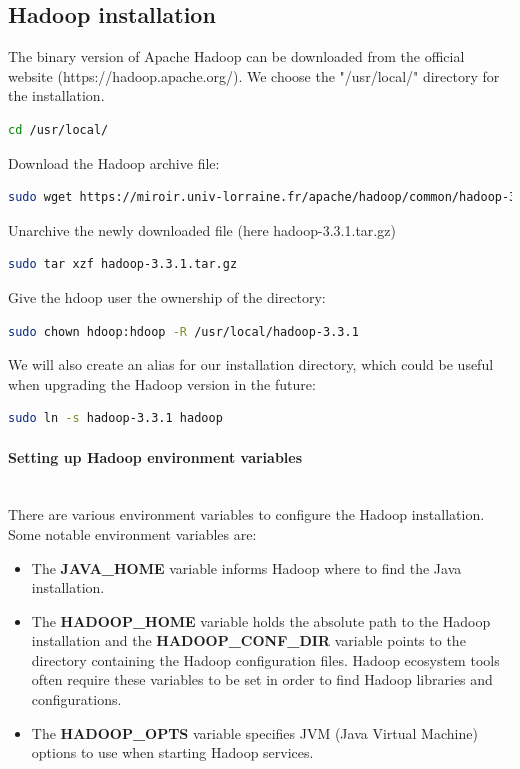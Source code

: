 \documentclass[12pt,english]{book}
\begin{document}
\subsection{Hadoop installation}


The binary version of Apache Hadoop can be downloaded from the official website (https://hadoop.apache.org/).
We choose the "/usr/local/" directory for the installation.
\begin{lstlisting}[language=bash, frame=single, basicstyle=\footnotesize]
cd /usr/local/
\end{lstlisting}
Download the Hadoop archive file:
\begin{lstlisting}[language=bash, frame=single, basicstyle=\footnotesize]
sudo wget https://miroir.univ-lorraine.fr/apache/hadoop/common/hadoop-3.3.1/hadoop-3.3.1.tar.gz
\end{lstlisting}
Unarchive the newly downloaded file (here hadoop-3.3.1.tar.gz)
\begin{lstlisting}[language=bash, frame=single, basicstyle=\footnotesize]
sudo tar xzf hadoop-3.3.1.tar.gz
\end{lstlisting}
Give the hdoop user the ownership of the directory:
\begin{lstlisting}[language=bash, frame=single, basicstyle=\footnotesize]
sudo chown hdoop:hdoop -R /usr/local/hadoop-3.3.1
\end{lstlisting}
We will also create an alias for our installation directory, which could be useful when upgrading the Hadoop version in the future:
\begin{lstlisting}[language=bash, frame=single, basicstyle=\footnotesize]
sudo ln -s hadoop-3.3.1 hadoop
\end{lstlisting}


\paragraph{Setting up Hadoop environment variables}\mbox{}\\


There are various environment variables to configure the Hadoop installation.
Some notable environment variables are:
\begin{itemize}
\item
The \textbf{JAVA\_HOME} variable informs Hadoop where to find the Java installation.

\item
The \textbf{HADOOP\_HOME} variable holds the absolute path to the Hadoop installation and the \textbf{HADOOP\_CONF\_DIR} variable points to the directory containing the Hadoop configuration files.
Hadoop ecosystem tools often require these variables to be set in order to find Hadoop libraries and configurations.

\item
The \textbf{HADOOP\_OPTS}  variable specifies JVM (Java Virtual Machine) options to use when starting Hadoop services.

\end{itemize}
\end{document}
